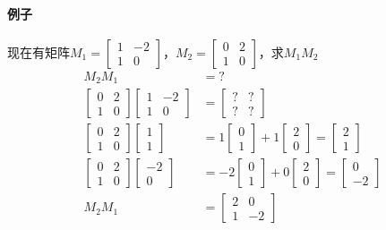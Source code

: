 \documentclass[UTF8]{ctexart}
\begin{document}
\paragraph{例子}
现在有矩阵$M_1 = \begin{bmatrix}
	1&-2 \\ 1&0
\end{bmatrix}$，$M_2= \begin{bmatrix}
	0&2 \\ 1&0
\end{bmatrix}$，求$M_1M_2$
\begin{align*}
	M_2M_1 &= ? \\
	\begin{bmatrix}
		0&2 \\ 1&0
	\end{bmatrix} \begin{bmatrix}
		1&-2 \\ 1&0
	\end{bmatrix} &= \begin{bmatrix}
		?&? \\ ?&?
	\end{bmatrix} \\ \begin{bmatrix}
		0&2 \\ 1&0
	\end{bmatrix} \begin{bmatrix}
		1 \\ 1
	\end{bmatrix} &= 1 \begin{bmatrix}
		0 \\ 1
	\end{bmatrix} + 1 \begin{bmatrix}
		2 \\ 0
	\end{bmatrix} = \begin{bmatrix}
		2 \\ 1
	\end{bmatrix} \\ \begin{bmatrix}
		0&2 \\ 1&0
	\end{bmatrix} \begin{bmatrix}
		-2 \\ 0
	\end{bmatrix} &= -2 \begin{bmatrix}
		0 \\ 1
	\end{bmatrix} + 0 \begin{bmatrix}
		2 \\ 0
	\end{bmatrix} = \begin{bmatrix}
		0 \\ -2
	\end{bmatrix} \\ M_2M_1 &= \begin{bmatrix}
		2&0 \\ 1&-2
	\end{bmatrix}
\end{align*}
\end{document}
